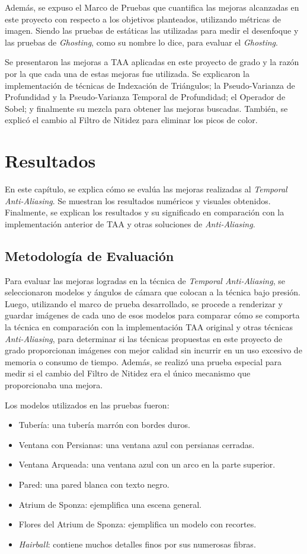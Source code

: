 \documentclass[pregrado]{tesis-usb} %
\begin{document}
Además, se expuso el Marco de Pruebas que cuantifica las mejoras alcanzadas en este proyecto con respecto a los objetivos planteados, utilizando métricas de imagen. Siendo las pruebas de estáticas las utilizadas para medir el desenfoque y las pruebas de \textit{Ghosting}, como su nombre lo dice, para evaluar el \textit{Ghosting}.

Se presentaron las mejoras a TAA aplicadas en este proyecto de grado y la razón por la que cada una de estas mejoras fue utilizada. Se explicaron la implementación de técnicas de Indexación de Triángulos; la Pseudo-Varianza de Profundidad y la Pseudo-Varianza Temporal de Profundidad; el Operador de Sobel; y finalmente su mezcla para obtener las mejoras buscadas. También, se explicó el cambio al Filtro de Nitidez para eliminar los picos de color. 




\chapter{Resultados}
En este capítulo, se explica cómo se evalúa las mejoras realizadas al \textit{Temporal Anti-Aliasing}. Se muestran los resultados numéricos y visuales obtenidos. Finalmente, se explican los resultados y su significado en comparación con la implementación anterior de TAA y otras soluciones de \textit{Anti-Aliasing}.

\section{Metodología de Evaluación}
Para evaluar las mejoras logradas en la técnica de \textit{Temporal Anti-Aliasing}, se seleccionaron modelos y ángulos de cámara que colocan a la técnica bajo presión. Luego, utilizando el marco de prueba desarrollado, se procede a renderizar y guardar imágenes de cada uno de esos modelos para comparar cómo se comporta la técnica en comparación con la implementación TAA original y otras técnicas \textit{Anti-Aliasing}, para determinar si las técnicas propuestas en este proyecto de grado proporcionan imágenes con mejor calidad sin incurrir en un uso excesivo de memoria o consumo de tiempo. Además, se realizó una prueba especial para medir si el cambio del Filtro de Nitidez era el único mecanismo que proporcionaba una mejora.

Los modelos utilizados en las pruebas fueron:
\begin{itemize}
\item Tubería: una tubería marrón con bordes duros.
\item Ventana con Persianas: una ventana azul con persianas cerradas.
\item Ventana Arqueada: una ventana azul con un arco en la parte superior.
\item Pared: una pared blanca con texto negro.
\item Atrium de Sponza: ejemplifica una escena general.
\item Flores del Atrium de Sponza: ejemplifica un modelo con recortes.
\item \textit{Hairball}: contiene muchos detalles finos por sus numerosas fibras.
\end{itemize}
\end{document}
